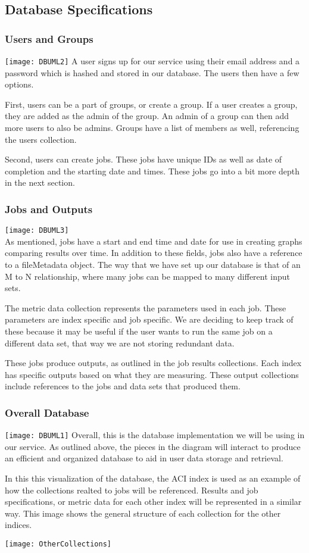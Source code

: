 \subsection{Database Specifications}
\subsubsection{Users and Groups}
\texttt{[image: DBUML2]}
A user signs up for our service using their email address and a password which is hashed and stored in our database. The users then have a few options.\par
First, users can be a part of groups, or create a group. If a user creates a group, they are added as the admin of the group. An admin of a group can then add more users to also be admins. Groups have a list of members as well, referencing the users collection.\par
Second, users can create jobs. These jobs have unique IDs as well as date of completion and the starting date and times. These jobs go into a bit more depth in the next section.
\subsubsection{Jobs and Outputs}
\texttt{[image: DBUML3]}\\
As mentioned, jobs have a start and end time and date for use in creating graphs comparing results over time. In addition to these fields, jobs also have a reference to a fileMetadata object. The way that we have set up our database is that of an M to N relationship, where many jobs can be mapped to many different input sets.\par
The metric data collection represents the parameters used in each job. These parameters are index specific and job specific. We are deciding to keep track of these because it may be useful if the user wants to run the same job on a different data set, that way we are not storing redundant data.\par
These jobs produce outputs, as outlined in the job results collections. Each index has specific outputs based on what they are measuring. These output collections include references to the jobs and data sets that produced them.\par
\subsubsection{Overall Database}
\texttt{[image: DBUML1]}
Overall, this is the database implementation we will be using in our service. As outlined above, the pieces in the diagram will interact to produce an efficient and organized database to aid in user data storage and retrieval.\par
In this this visualization of the database, the ACI index is used as an example of how the collections realted to jobs will be referenced. Results and job specifications, or metric data for each other index will be represented in a similar way. This image shows the general structure of each collection for the other indices. \par
\texttt{[image: OtherCollections]}